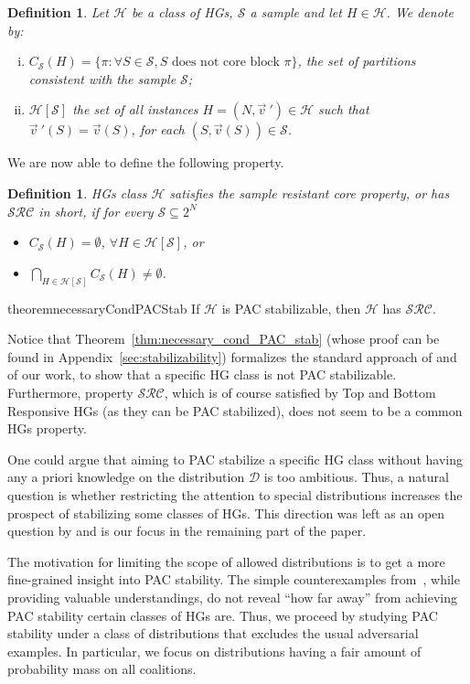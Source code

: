 \documentclass[letterpaper]{article} %
\newtheorem{definition}[theorem]{Definition}
\newcommand{\distribution}{\mathcal{D}}
\newcommand{\set}[1]{\{#1\}}
\newcommand{\hclass}{\ensuremath{\mathcal{H}}}
\newcommand{\sample}{\ensuremath{\mathcal{S}}}
\begin{document}
\begin{definition}
Let $\mathcal{H}$ be a class of HGs, $\sample$ a sample and let $H \in \hclass$. We denote by:
\begin{enumerate}[(i)]
    \item $C_\sample(H)= \set{\pi : \forall S\in \sample, S \text{ does not core block } \pi}$, the set of partitions consistent with the sample $\sample$;
    \item $\hclass[\mathcal{S}]$ the set of all instances $H=(N, \vec{v}\ ')\in\hclass$ such that $\vec{v}\ '(S)= \vec{v}(S)$, for each $(S, \vec{v}(S))\in\sample$.
\end{enumerate}
\end{definition}
We are now able to define the following property.
\begin{definition}
HGs class $\hclass$ satisfies the {\em sample resistant core} property, or has $\mathcal{SRC}$ in short, if for every $ \mathcal{S}\subseteq 2^N$
\begin{itemize}
    \item $C_\mathcal{S}(H)=\emptyset $, $\forall H \in \mathcal{H}[\mathcal{S}]$, or
    \item $\bigcap_{H \in \mathcal{H}[\mathcal{S}]} C_\mathcal{S}(H) \neq \emptyset$.
\end{itemize}
\end{definition}
\begin{restatable}{theorem}{necessaryCondPACStab}\label{thm:necessary_cond_PAC_stab}
If $\mathcal{H}$ is PAC stabilizable, then $\mathcal{H}$ has $\mathcal{SRC}$.
\end{restatable}
Notice that Theorem~\ref{thm:necessary_cond_PAC_stab} (whose proof can be found in Appendix~\ref{sec:stabilizability}) formalizes the standard approach of \citet{SliwinskiZ17} and of our work, to show that a specific HG class is not PAC stabilizable. Furthermore, property $\mathcal{SRC}$, which is of course satisfied by Top and Bottom Responsive HGs (as they can be PAC stabilized), does not seem to be a common HGs property.

One could argue that aiming to PAC stabilize a specific HG class without having any a priori knowledge on the distribution $\distribution$ is too ambitious. Thus, a natural question is whether restricting the attention to special distributions increases the prospect of stabilizing some classes of HGs. This direction was left as an open question by \citet{SliwinskiZ17} and is our focus in the remaining part of the paper.

The motivation for limiting the scope of allowed distributions is to get a more fine-grained insight into PAC stability. The simple counterexamples from~\cite{SliwinskiZ17}, while providing valuable understandings, do not reveal ``how far away'' from achieving PAC stability certain classes of HGs are.
Thus, we proceed by studying PAC stability under a class of distributions that excludes the usual adversarial examples. In particular, we focus on distributions having a fair amount of probability mass on all coalitions.
\end{document}

